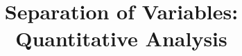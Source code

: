 \documentclass{beamer}
\title[Section 1.3]{Separation of Variables: Quantitative Analysis}
\begin{document}
\begin{frame}
\titlepage
\end{frame}
\end{document}
